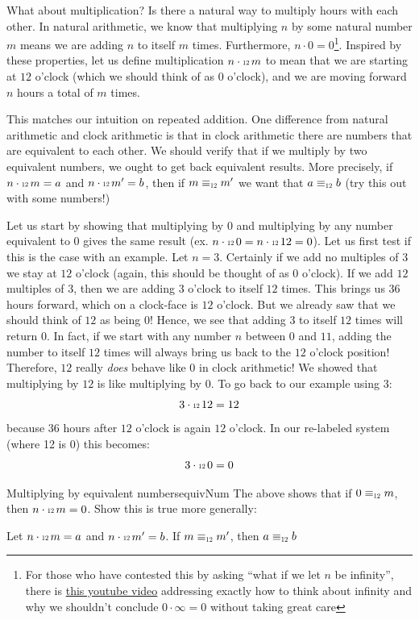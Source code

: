 \documentclass{article}
\newcommand\scalemath[2]{\scalebox{#1}{\mbox{\ensuremath{\displaystyle #2}}}}
\newcommand{\Equiv}[1]{\equiv_{\scalemath{0.6}{#1}}}
\newcommand{\Cdot}[1]{\cdot{\scalemath{0.6}{#1}}\,}
\begin{document}
What about multiplication? Is there a natural way to multiply hours with each other. In natural arithmetic, we
know that multiplying $n$ by some natural number $m$ means we are adding $n$ to itself $m$ times. Furthermore,
$n\cdot 0 = 0$\footnote{For those who have contested this by asking ``what if we let $n$ be infinity'', there
  is \href{https://www.youtube.com/watch?v=-UvTWUEGDO8}{this youtube video} addressing exactly how to think
about infinity and why we shouldn't conclude $0\cdot \infty = 0$ without taking great care}. Inspired by these
properties, let us define multiplication $n\Cdot{12} m$ to mean that we are starting at $12$ o'clock (which we
should think of as $0$ o'clock), and we are moving forward $n$ hours a total of $m$ times.

This matches our intuition on repeated addition. One difference from natural arithmetic and clock arithmetic
is that in clock arithmetic there are numbers that are equivalent to each other. We should verify that if we
multiply by two equivalent numbers, we ought to get back equivalent results. More precisely, if $n\Cdot{12}m = a$ and
$n\Cdot{12}m' = b$, then if $m\Equiv{12}m'$ we want that $a\Equiv{12}b$ (try this out with some numbers!)

Let us start by showing that multiplying by $0$ and multiplying by any number equivalent to $0$ gives the same
result (ex. $n\Cdot{12} 0 = n\Cdot{12} 12 = 0$). Let us first test if this is the case with an example. Let $n
= 3$. Certainly if we add no multiples of $3$ we stay at $12$ o'clock (again, this should be thought of as $0$
o'clock). If we add $12$ multiples of $3$, then we are adding $3$ o'clock to itself $12$ times. This brings us
$36$ hours forward, which on a clock-face is $12$ o'clock. But we already saw that we should think of $12$ as
being $0$! Hence, we see that adding $3$ to itself $12$ times will return $0$. In fact, if we start with any
number $n$ between $0$ and $11$, adding the number to itself $12$ times will always bring us back to the $12$
o'clock position! Therefore, $12$ really \emph{does} behave like $0$ in clock arithmetic! We showed that
multiplying by $12$ is like multiplying by 0. To go back to our example using $3$:
\[
  3\Cdot{12}12 = 12
\]
because $36$ hours after $12$ o'clock is again $12$ o'clock. In our re-labeled system (where 12
is 0) this becomes:
\[
  3\Cdot{12}0 = 0
\]
\begin{exercise}{Multiplying by equivalent numbers}{equivNum}
  The above shows that if $0\Equiv{12} m$, then $n\Cdot{12}m = 0$. Show this is true more generally:
  \begin{center}
      Let $n\Cdot{12}m = a$ and $n\Cdot{12}m' = b$. If $m\Equiv{12}m'$, then $a\Equiv{12}b$
  \end{center}
\end{exercise}
\end{document}
